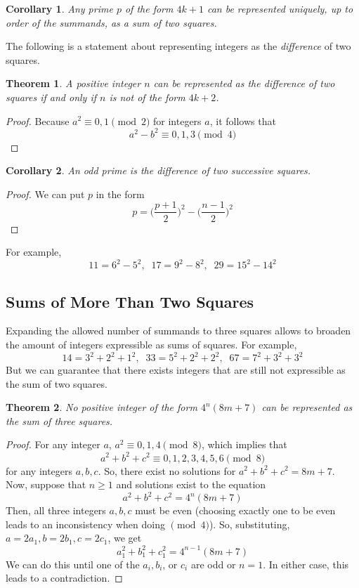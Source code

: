 \documentclass{article}
\newtheorem{theorem}{Theorem}[section]
\newtheorem{corollary}{Corollary}[theorem]
\theoremstyle{remark}
\theoremstyle{definition}
\begin{document}
\begin{corollary}
Any prime $p$ of the form $4k+1$ can be represented uniquely, up to order of the summands, as a sum of two squares. 
\end{corollary}

The following is a statement about representing integers as the \textit{difference} of two squares. 

\begin{theorem}
A positive integer $n$ can be represented as the difference of two squares if and only if $n$ is not of the form $4k + 2$. 
\end{theorem}
\begin{proof}
Because $a^2 \equiv 0, 1 \pmod{2}$ for integers $a$, it follows that
\[a^2 - b^2 \equiv 0, 1, 3 \pmod{4}\]
\end{proof}

\begin{corollary}
An odd prime is the difference of two successive squares. 
\end{corollary}
\begin{proof}
We can put $p$ in the form 
\[p = \bigg( \frac{p+1}{2} \bigg)^2 - \bigg( \frac{n-1}{2} \bigg)^2\]
\end{proof}

For example, 
\[11 = 6^2 - 5^2, \;\; 17 = 9^2 - 8^2, \;\; 29 = 15^2 - 14^2\]

\subsection{Sums of More Than Two Squares}
Expanding the allowed number of summands to three squares allows to broaden the amount of integers expressible as sums of squares. For example, 
\[14 = 3^2 + 2^2 + 1^2, \;\; 33 = 5^2 + 2^2 + 2^2, \;\; 67 = 7^2 + 3^2 + 3^2\]
But we can guarantee that there exists integers that are still not expressible as the sum of two squares. 

\begin{theorem}
No positive integer of the form $4^n (8m+7)$ can be represented as the sum of three squares. 
\end{theorem}
\begin{proof}
For any integer $a$, $a^2 \equiv 0, 1, 4 \pmod{8}$, which implies that
\[a^2 + b^2 + c^2 \equiv 0, 1, 2, 3, 4, 5, 6 \pmod{8}\]
for any integers $a, b, c$. So, there exist no solutions for $a^2 + b^2 + c^2 = 8m + 7$. Now, suppose that $n\geq 1$ and solutions exist to the equation
\[a^2 + b^2 + c^2 = 4^n (8m + 7)\]
Then, all three integers $a, b, c$ must be even (choosing exactly one to be even leads to an inconsistency when doing $\pmod{4}$). So, substituting, $a = 2 a_1, b = 2b_1, c= 2c_1$, we get 
\[a_1^2 + b_1^2 + c_1^2 = 4^{n-1} (8m+7)\]
We can do this until one of the $a_i, b_i$, or $c_i$ are odd or $n = 1$. In either case, this leads to a contradiction. 
\end{proof}
\end{document}
